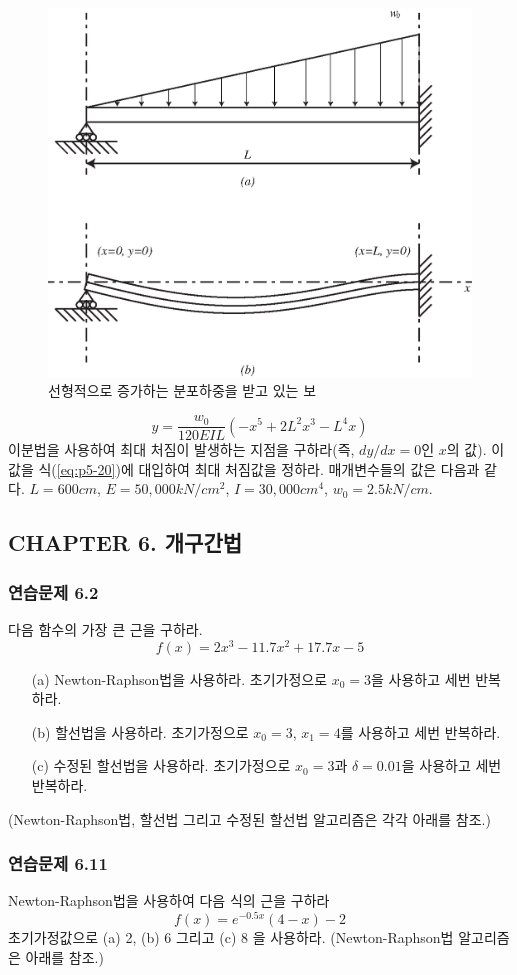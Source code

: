 \begin{figure}[!hbpt]
\centering
\includegraphics[keepaspectratio=true,width=0.6\linewidth]{figs/5-20.eps}
\caption{선형적으로 증가하는 분포하중을 받고 있는 보}
\label{fig:p5-20}
\end{figure}
\begin{equation}\label{eq:p5-20}
y=\frac{w_{0}}{120EIL}(-x^5 + 2L^2 x^3 - L^4 x)
\end{equation}
이분법을 사용하여 최대 처짐이 발생하는 지점을 구하라(즉, $dy/dx=0$인 $x$의 값). 이 값을 식(\ref{eq:p5-20})에 대입하여 최대 처짐값을 정하라. 매개변수들의 값은 다음과 같다. $L=600cm$, $E=50,000 kN/cm^2$, $I=30,000 cm^4$, $w_{0}=2.5 kN/cm$.

\subsection{CHAPTER 6. 개구간법}
\subsubsection{연습문제 6.2}
다음 함수의 가장 큰 근을 구하라.
\begin{displaymath}
f(x)=2x^3 -11.7x^2 +17.7x-5
\end{displaymath}
\begin{itemize}
\item[(a)] Newton-Raphson법을 사용하라. 초기가정으로 $x_0 =3$을 사용하고 세번 반복하라.
\item[(b)] 할선법을 사용하라. 초기가정으로 $x_{0}=3$, $x_{1}=4$를 사용하고 세번 반복하라.
\item[(c)] 수정된 할선법을 사용하라. 초기가정으로 $x_{0}=3$과 $\delta=0.01$을 사용하고 세번 반복하라.
\end{itemize}
(Newton-Raphson법, 할선법 그리고 수정된 할선법 알고리즘은 각각 아래를 참조.)
\subsubsection{연습문제 6.11}
Newton-Raphson법을 사용하여 다음 식의 근을 구하라
\begin{displaymath}
f(x)=e^{-0.5x}(4-x)-2
\end{displaymath}
초기가정값으로 (a) 2, (b) 6 그리고 (c) 8 을 사용하라. (Newton-Raphson법 알고리즘은 아래를 참조.)

